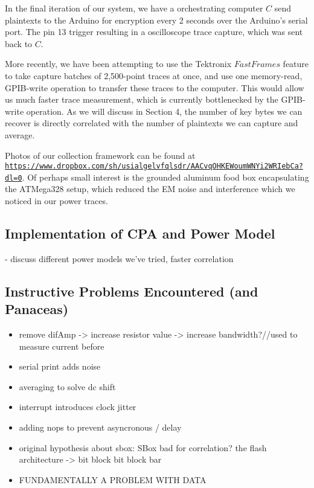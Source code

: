 \documentclass[journal]{ieee_style}
\begin{document}
In the final iteration of our system, we have a orchestrating computer $C$ send plaintexts to the Arduino for encryption every 2 seconds over the Arduino's serial port. The pin 13 trigger resulting in a oscilloscope trace capture, which was sent back to $C$. 

More recently, we have been attempting to use the Tektronix $Fast Frames$ feature to take capture batches of 2,500-point traces at once, and use one memory-read, GPIB-write operation to transfer these traces to the computer. This would allow us much faster trace measurement, which is currently bottlenecked by the GPIB-write operation. As we will discuss in Section 4, the number of key bytes we can recover is directly correlated with the number of plaintexts we can capture and average.

Photos of our collection framework can be found at \texttt{\url{https://www.dropbox.com/sh/usialgelvfqlsdr/AACvqOHKEWoumWNYi2WRIebCa?dl=0}}. Of perhaps small interest is the grounded aluminum food box encapsulating the ATMega328 setup, which reduced the EM noise and interference which we noticed in our power traces.

\subsection{Implementation of CPA and Power Model}
- discuss different power models we've tried, faster correlation

\subsection{Instructive Problems Encountered (and Panaceas)}


\begin{itemize}[-]
\item remove difAmp -> increase resistor value -> increase bandwidth?//used to measure current before
\item serial print adds noise
\item averaging to solve dc shift
\item interrupt introduces clock jitter
\item adding nops to prevent asyncronous / delay
\item original hypothesis about sbox:  SBox bad for correlation? the flash architecture -> bit block bit block bar
\item FUNDAMENTALLY A PROBLEM WITH DATA
\end{itemize}
\end{document}

